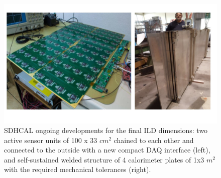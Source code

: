 \begin{figure}[t!]
\centering
\includegraphics[width=1.0\hsize]{Detector/fig/SDHCAL_dev.jpg}
\caption{SDHCAL ongoing developments for the final ILD dimensions: two active sensor units of 100 x 33 $cm^2$ chained to each other and connected to the outside with a new compact DAQ interface (left), and self-sustained welded structure of 4 calorimeter plates of 1x3 $m^2$   with the required mechanical tolerances (right).}
\label{fig:det:SDHCAL_dev}
\end{figure}

\vspace{2cm}